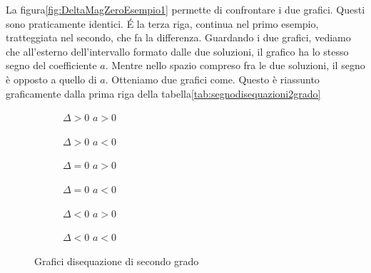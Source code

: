 La figura\nobs\vref{fig:DeltaMagZeroEsempio1} permette di confrontare i due grafici. Questi sono praticamente identici. \'{E} la terza riga, continua nel primo esempio, tratteggiata nel secondo, che fa la differenza. Guardando i due grafici, vediamo che all'esterno dell'intervallo formato dalle due soluzioni, il grafico ha lo stesso segno del coefficiente $a$. Mentre nello spazio compreso fra le due soluzioni, il segno è opposto a quello di $a$. Otteniamo due grafici come\nobs{}. Questo è riassunto graficamente dalla prima riga della tabella\nobs\vref{tab:segnodisequazioni2grado}
\begin{figure}
	\begin{subfigure}[b]{.5\linewidth}
		\centering

		\caption{$\Delta>0$ $a>0$}\label{graf:dis2GDeltaMagZa2x}
	\end{subfigure}%
	\begin{subfigure}[b]{.5\linewidth}
		\centering
	
		\caption{$\Delta>0$ $a<0$}\label{graf:dis2GDeltaMagZb2x}
	\end{subfigure}
	\begin{subfigure}[b]{.5\linewidth}
		\centering
		
		\caption{$\Delta=0$ $a>0$}\label{graf:dis2GDeltaUguaZa2x}
			\end{subfigure}%
	\begin{subfigure}[b]{.5\linewidth}
		\centering
		
		\caption{$\Delta=0$ $a<0$}\label{graf:dis2GDeltaUguaZb2x}
	\end{subfigure}
\begin{subfigure}[b]{.5\linewidth}
	\centering
		
	\caption{$\Delta<0$ $a>0$}\label{graf:dis2GDeltaMinorZa2x}
\end{subfigure}%
\begin{subfigure}[b]{.5\linewidth}
	\centering

	\caption{$\Delta<0$ $a<0$}\label{graf:dis2GDeltaMinorZb2x}
\end{subfigure}
	\caption{Grafici disequazione di secondo grado}
\end{figure}
